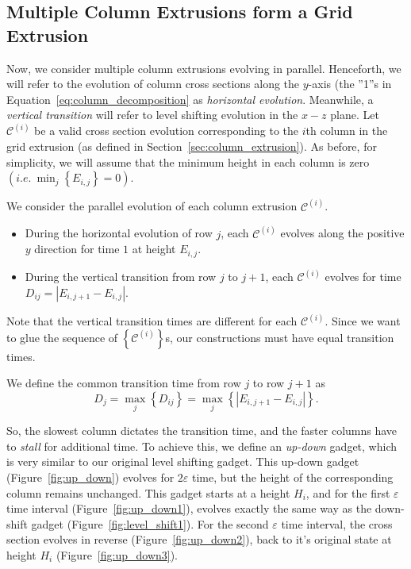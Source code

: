 \subsection{Multiple Column Extrusions form a Grid Extrusion}
\label{sec:grid_extrusion}

Now, we consider multiple column extrusions evolving in parallel.
Henceforth, we will refer to the evolution of column cross sections along the $y$-axis
(the ''1''s in Equation~\ref{eq:column_decomposition} as \emph{horizontal evolution}.
Meanwhile, a \emph{vertical transition} will refer to level shifting evolution in the $x-z$ plane.
Let $\mathcal C^{(i)}$ be a valid cross section evolution corresponding
to the $i$th column in the grid extrusion (as defined in Section~\ref{sec:column_extrusion}).
As before, for simplicity, we will assume that the minimum height in each column is zero $\left( i.e.\ \min_j\left\{ E_{i,j}\right\} = 0 \right)$.

%

We consider the parallel evolution of each column extrusion $\mathcal C^{(i)}$.
\begin{itemize}
    \item During the horizontal evolution of row $j$, each $\mathcal C^{(i)}$ evolves along the positive $y$ direction for time $1$ at height $E_{i,j}$.
    \item During the vertical transition from row $j$ to $j+1$, each $\mathcal C^{(i)}$ evolves for time $ D_{ij} = \left| E_{i,j+1}-E_{i,j}\right|$.
\end{itemize}
Note that the vertical transition times are different for each $\mathcal C^{(i)}$.
Since we want to glue the sequence of $\left\{ \mathcal C^{(i)}\right\}$s, our constructions must have equal transition times.

\begin{definition}
\label{def:slowest_column}
We define the common transition time from row $j$ to row $j+1$ as
$$D_j = \max_j\left\{ D_{ij}\right\} = \max_j\left\{ \left| E_{i,j+1}-E_{i,j}\right|\right\}.$$
\end{definition}

So, the slowest column dictates the transition time, and the faster columns have to \emph{stall} for additional time.
To achieve this, we define an \emph{up-down} gadget, which is very similar to our original level shifting gadget.
This up-down gadget (Figure~\ref{fig:up_down}) evolves for $2\varepsilon$ time, but the height of the corresponding column remains unchanged.
This gadget starts at a height $H_i$, and for the first $\varepsilon$ time interval (Figure~\ref{fig:up_down1}),
evolves exactly the same way as the down-shift gadget (Figure~\ref{fig:level_shift1}).
For the second $\varepsilon$ time interval, the cross section evolves in reverse (Figure~\ref{fig:up_down2}),
back to it's original state at height $H_i$ (Figure~\ref{fig:up_down3}).

